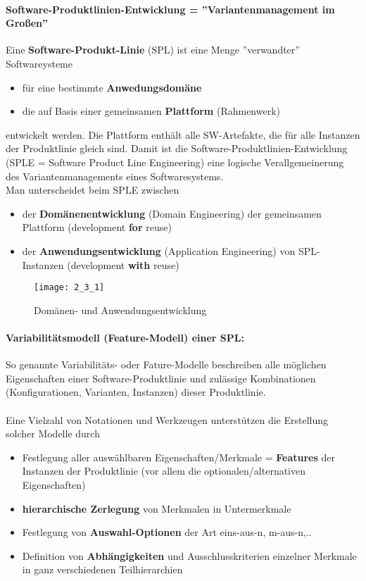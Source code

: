 \paragraph{Software-Produktlinien-Entwicklung = ''Variantenmanagement im Großen''}
Eine \textbf{Software-Produkt-Linie} (SPL) ist eine Menge ''verwandter'' Softwareysteme
\begin{itemize}
	\item für eine bestimmte \textbf{Anwedungsdomäne}
	\item die auf Basis einer gemeinsamen \textbf{Plattform} (Rahmenwerk)
\end{itemize}
entwickelt werden. Die Plattform enthält alle SW-Artefakte, die für alle Instanzen der Produktlinie gleich sind. Damit ist die Software-Produktlinien-Entwicklung (SPLE = Software Product Line Engineering) eine logische Verallgemeinerung des Variantenmanagements eines Softwaresystems.
\\
Man unterscheidet beim SPLE zwischen
\begin{itemize}
	\item der \textbf{Domänenentwicklung} (Domain Engineering) der gemeinsamen Plattform (development \textbf{for} reuse)
	\item der \textbf{Anwendungsentwicklung} (Application Engineering) von SPL-Instanzen (development \textbf{with} reuse)
\end{itemize}
\begin{figure}[h]
	\centering
	\caption{Domänen- und Anwendungsentwicklung}
	\texttt{[image: 2\_3\_1]}
\end{figure}
\paragraph{Variabilitätsmodell (Feature-Modell) einer SPL:}
So genannte Variabilitäts- oder Fature-Modelle beschreiben alle möglichen Eigenschaften einer Software-Produktlinie und zulässige Kombinationen (Konfigurationen, Varianten, Instanzen) dieser Produktlinie. 
\\
\\
Eine Vielzahl von Notationen und Werkzeugen unterstützen die Erstellung solcher Modelle durch
\begin{itemize}
	\item Festlegung aller auswählbaren Eigenschaften/Merkmale = \textbf{Features} der Instanzen der Produktlinie (vor allem die optionalen/alternativen Eigenschaften)
	\item \textbf{hierarchische Zerlegung} von Merkmalen in Untermerkmale
	\item Festlegung von \textbf{Auswahl-Optionen} der Art eins-aus-n, m-aus-n,..
	\item Definition von \textbf{Abhängigkeiten} und Ausschlusskriterien einzelner Merkmale in ganz verschiedenen Teilhierarchien
\end{itemize}
